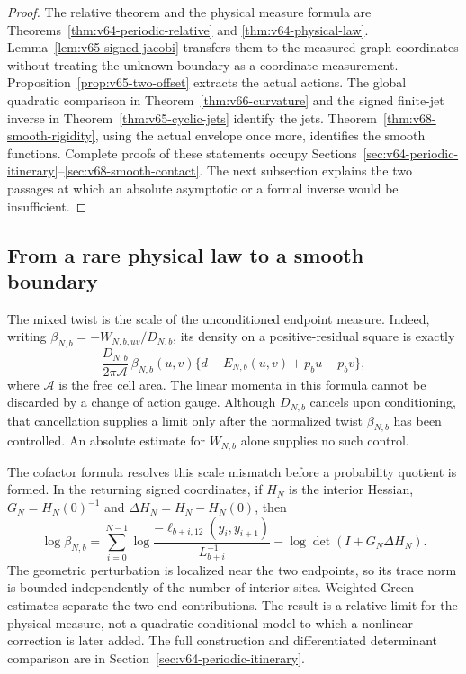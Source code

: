 \begin{proof}
The relative theorem and the physical measure formula are
Theorems~\ref{thm:v64-periodic-relative} and
\ref{thm:v64-physical-law}.  Lemma~\ref{lem:v65-signed-jacobi}
transfers them to the measured graph coordinates without treating the
unknown boundary as a coordinate measurement.
Proposition~\ref{prop:v65-two-offset} extracts the actual actions.
The global quadratic comparison in Theorem~\ref{thm:v66-curvature}
and the signed finite-jet inverse in Theorem~\ref{thm:v65-cyclic-jets}
identify the jets.  Theorem~\ref{thm:v68-smooth-rigidity}, using the
actual envelope once more, identifies the smooth functions.  Complete
proofs of these statements occupy
Sections~\ref{sec:v64-periodic-itinerary}--\ref{sec:v68-smooth-contact}.
The next subsection explains the two passages at which an absolute
asymptotic or a formal inverse would be insufficient.
\end{proof}

\subsection{From a rare physical law to a smooth boundary}

The mixed twist is the scale of the unconditioned endpoint measure.
Indeed, writing $\beta_{N,b}=-W_{N,b,uv}/D_{N,b}$, its density on a
positive-residual square is exactly
\begin{equation}\label{eq:v70-physical-interface}
 \frac{D_{N,b}}{2\pi\mathcal A}\,
 \beta_{N,b}(u,v)\{d-E_{N,b}(u,v)+p_bu-p_bv\},
\end{equation}
where $\mathcal A$ is the free cell area.  The linear momenta in this
formula cannot be discarded by a change of action gauge.  Although
$D_{N,b}$ cancels upon conditioning, that cancellation supplies a limit
only after the normalized twist $\beta_{N,b}$ has been controlled.
An absolute estimate for $W_{N,b}$ alone supplies no such control.

The cofactor formula resolves this scale mismatch before a probability
quotient is formed.  In the returning signed coordinates, if $H_N$ is
the interior Hessian, $G_N=H_N(0)^{-1}$ and
$\Delta H_N=H_N-H_N(0)$, then
\[
 \log\beta_{N,b}
 =\sum_{i=0}^{N-1}\log
   \frac{-\ell_{b+i,12}(y_i,y_{i+1})}{L_{b+i}^{-1}}
       -\log\det(I+G_N\Delta H_N).
\]
The geometric perturbation is localized near the two endpoints, so its
trace norm is bounded independently of the number of interior sites.
Weighted Green estimates separate the two end contributions.  The
result is a relative limit for the physical measure, not a quadratic
conditional model to which a nonlinear correction is later added.
The full construction and differentiated determinant comparison are in
Section~\ref{sec:v64-periodic-itinerary}.

